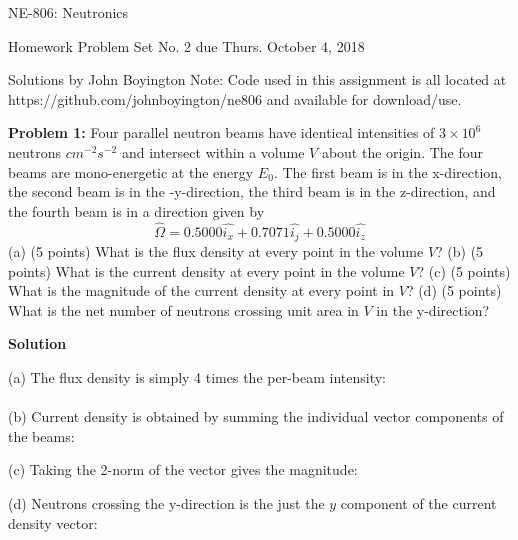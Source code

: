 \documentclass{amsart}
\theoremstyle{definition}
\begin{document}
\LARGE{NE-806: Neutronics}
 
\large
Homework Problem Set No. 2 due Thurs. October 4, 2018
 
Solutions by John Boyington
Note: Code used in this assignment is all located at https://github.com/johnboyington/ne806 and available for download/use.
\newline
\bigskip
 
\textbf{Problem 1:} Four parallel neutron beams have identical intensities of $3\times 10^6$ neutrons $cm^{-2} s^{-2}$ and intersect within a volume $V$ about the origin. The four beams are mono-energetic at the energy $E_0$. The first beam is in the x-direction, the second beam is in the -y-direction, the third beam is in the z-direction, and the fourth beam is in a direction given by
\begin{equation*}
    \hat{\Omega} = 0.5000 \hat{i_x} + 0.7071\hat{i_j} + 0.5000\hat{i_z}
\end{equation*}
(a) (5 points) What is the flux density at every point in the volume $V$?\newline
(b) (5 points) What is the current density at every point in the volume $V$?\newline
(c) (5 points) What is the magnitude of the current density at every point in $V$?\newline
(d) (5 points) What is the net number of neutrons crossing unit area in $V$ in the y-direction?\newline
 
\textbf{Solution}

(a) The flux density is simply 4 times the per-beam intensity: \\
 \\

(b) Current density is obtained by summing the individual vector components of the beams: \\

(c) Taking the 2-norm of the vector gives the magnitude: \\

(d) Neutrons crossing the y-direction is the just the $y$ component of the current density vector: \\
\end{document}
